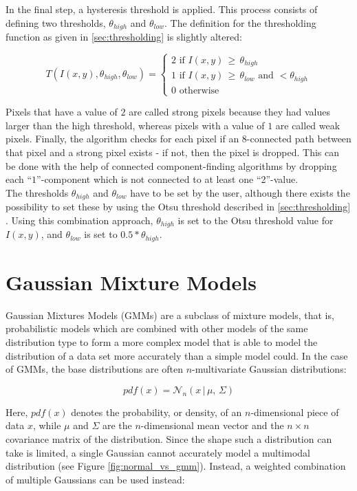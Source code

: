 In the final step, a hysteresis threshold is applied. This process consists of defining two thresholds, $\theta_{high}$ and $\theta_{low}$. The definition for the thresholding function as given in \ref{sec:thresholding} is slightly altered:

\[ T(I(x, y), \theta_{high}, \theta_{low}) =  \begin{cases}
							2 \text{ if } I(x, y) \, \geq \, \theta_{high} \\
							1 \text{ if } I(x, y) \, \geq \, \theta_{low} \text{ and } < \theta_{high} \\
			          				0 \text{ otherwise}
			   			        \end{cases}
\]

\noindent Pixels that have a value of $2$ are called strong pixels because they had values larger than the high threshold, whereas pixels with a value of $1$ are called weak pixels. Finally, the algorithm checks for each pixel if an 8-connected path between that pixel and a strong pixel exists - if not, then the pixel is dropped. This can be done with the help of connected component-finding algorithms by dropping each ``$1$''-component which is not connected to at least one ``2''-value.\\

\noindent The thresholds $\theta_{high}$ and $\theta_{low}$ have to be set by the user, although there exists the possibility to set these by using the Otsu threshold described in \ref{sec:thresholding} . Using this combination approach, $\theta_{high}$ is set to the Otsu threshold value for $I(x, y)$, and $\theta_{low}$ is set to $0.5 * \theta_{high}$.\cite{otsu_combine}


	\section{Gaussian Mixture Models}
Gaussian Mixtures Models (GMMs) are a subclass of mixture models, that is, probabilistic models which are combined with other models of the same distribution type to form a more complex model that is able to model the distribution of a data set more accurately than a simple model could. In the case of GMMs, the base distributions are often $n$-multivariate Gaussian distributions:

\[ pdf(x) = \mathcal{N}_n (x\,|\,\mu,\, \Sigma) \]

\noindent Here, $pdf(x)$ denotes the probability, or density, of an $n$-dimensional piece of data $x$, while $\mu$ and $\Sigma$ are the $n$-dimensional mean vector and the $n \times n$ covariance matrix of the distribution. Since the shape such a distribution can take is limited, a single Gaussian cannot accurately model a multimodal distribution (see Figure \ref{fig:normal_vs_gmm}). Instead, a weighted combination of multiple Gaussians can be used instead: \cite[pp. 430]{bishop_pattern}

